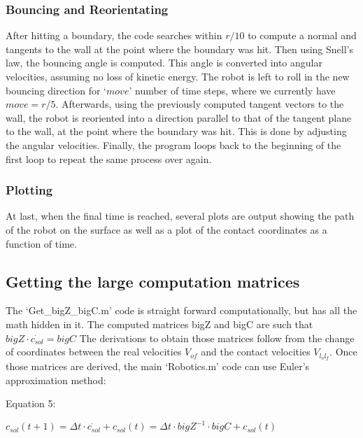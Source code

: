 \documentclass[journal]{IEEEtran}
\begin{document}
\subsubsection{Bouncing and Reorientating}
After hitting a boundary, the code searches within $r/10$ to compute a normal and tangents to the wall at the point where the boundary was hit. Then using Snell's law, the bouncing angle is computed. This angle is converted into angular velocities, assuming no loss of kinetic energy. The robot is left to roll in the new bouncing direction for `$move$' number of time steps, where we currently have $move = r/5$. Afterwards, using the previously computed tangent vectors to the wall, the robot is reoriented into a direction parallel to that of the tangent plane to the wall, at the point where the boundary was hit. This is done by adjusting the angular velocities. Finally, the program loops back to the beginning of the first loop to repeat the same process over again.
\subsubsection{Plotting}
At last, when the final time is reached, several plots are output showing the path of the robot on the surface as well as a plot of the contact coordinates as a function of time.
\subsection{Getting the large computation matrices}
The `Get\_bigZ\_bigC.m' code is straight forward computationally, but has all the math hidden in it. The computed matrices bigZ and bigC are such that $bigZ \cdot \dot{c_{sol}} = bigC$ The derivations to obtain those matrices follow from the change of coordinates between the real velocities $V_{of}$ and the contact velocities $V_{l_ol_f}$.
Once those matrices are derived, the main `Robotics.m' code can use Euler's approximation method: 
\begin{center}
Equation 5:
\end{center}

  \begin{center}
    $c_{sol}(t+1) = \Delta t \cdot \dot{c_{sol}} + c_{sol}(t) = \Delta t \cdot bigZ^{-1} \cdot bigC + c_{sol}(t)$
  \end{center}
\end{document}
